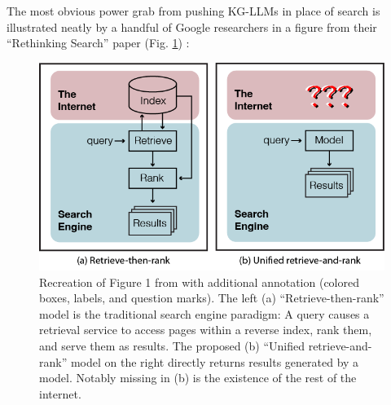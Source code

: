 \documentclass{article}
\begin{document}
The most obvious power grab from pushing KG-LLMs in place of search is
illustrated neatly by a handful of Google researchers in a figure from
their ``Rethinking Search'' paper (Fig. \ref{fig:rethinkingsearch}) \cite{metzlerRethinkingSearchMaking2021} :

\begin{figure}
\includegraphics[width=\linewidth]{img/rethinking_search_f1-01.png}
\caption{Recreation of Figure 1 from \cite{metzlerRethinkingSearchMaking2021}  with additional annotation
(colored boxes, labels, and question marks). The left (a)
``Retrieve-then-rank'' model is the traditional search engine paradigm:
A query causes a retrieval service to access pages within a reverse
index, rank them, and serve them as results. The proposed (b) ``Unified
retrieve-and-rank'' model on the right directly returns results
generated by a model. Notably missing in (b) is the existence of the
rest of the internet.}
\label{fig:rethinkingsearch}
\end{figure}
\end{document}
